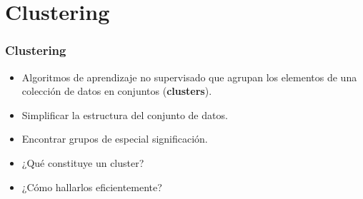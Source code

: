 \section{Clustering}\label{sec:clustering}

\begin{frame}
    \frametitle{Clustering}

    \begin{itemize}
        \item<1-> Algoritmos de aprendizaje no supervisado que agrupan los elementos de una colección de datos en conjuntos (\textbf{clusters}).
        \item<2-> Simplificar la estructura del conjunto de datos.
        \item<3-> Encontrar grupos de especial significación.
    \end{itemize}

    \begin{itemize}
        \item<4-> ¿Qué constituye un cluster?
        \item<5-> ¿Cómo hallarlos eficientemente?
    \end{itemize}

\end{frame}

